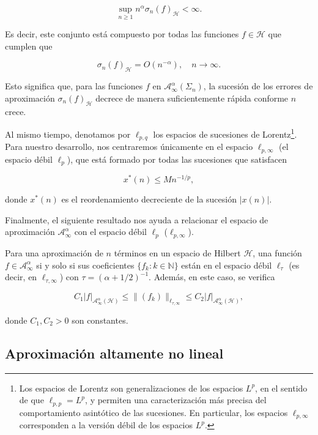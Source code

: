 \[
    \sup_{n \geq 1} n^{\alpha} \sigma_n(f)_{\mathcal{H}} < \infty.
\]

Es decir, este conjunto está compuesto por todas las funciones $f \in \mathcal{H}$ que cumplen que

\[
    \sigma_n(f)_{\mathcal{H}} = O(n^{-\alpha}), \quad n \to \infty.
\]

Esto significa que, para las funciones $f$ en $\mathcal{A}_{\infty}^{\alpha}(\Sigma_n)$, la sucesión de los errores de aproximación $\sigma_n(f)_{\mathcal{H}}$ decrece de manera suficientemente rápida conforme $n$ crece.

Al mismo tiempo, denotamos por $\ell_{p,q}$ los espacios de sucesiones de Lorentz\footnote{Los espacios de Lorentz son generalizaciones de los espacios $L^{p}$, en el sentido de que $\ell_{p, p} = L^{p}$, y permiten una caracterización más precisa del comportamiento asintótico de las sucesiones. En particular, los espacios $\ell_{p,\infty}$ corresponden a la versión débil de los espacios $L^{p}$.}. Para nuestro desarrollo, nos centraremos únicamente en el espacio $\ell_{p,\infty}$ (el espacio débil $\ell_{p}$), que está formado por todas las sucesiones que satisfacen

\[
    x^{*}(n) \leq M n^{-1/p},
\]

donde $x^{*}(n)$ es el reordenamiento decreciente de la sucesión $|x(n)|$.

Finalmente, el siguiente resultado nos ayuda a relacionar el espacio de aproximación $\mathcal{A}_{\infty}^{\alpha}$ con el espacio débil $\ell_p$ ($\ell_{p,\infty}$).

\begin{teorema}\label{teo:espaciosapprox-espacioslorentz}
    Para una aproximación de $n$ términos en un espacio de Hilbert $\mathcal{H}$, una función $f \in \mathcal{A}_{\infty}^{\alpha}$ si y solo si sus coeficientes $\{ f_k : k \in \mathbb{N}\}$ están en el espacio débil $\ell_{\tau}$ (es decir, en $\ell_{\tau, \infty}$) con $\tau = (\alpha + 1/2)^{-1}$. Además, en este caso, se verifica

    \[
        C_1 |f|_{\mathcal{A}_{\infty}^{\alpha}(\mathcal{H})} \leq \| (f_k) \|_{\ell_{\tau, \infty}} \leq C_2 |f|_{\mathcal{A}_{\infty}^{\alpha}(\mathcal{H})},
    \]

    donde $C_1, C_2 > 0$ son constantes.
\end{teorema}

\subsection{Aproximación altamente no lineal}

